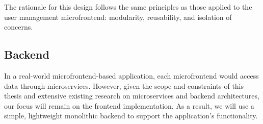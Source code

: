 The rationale for this design follows the same principles as those applied to the user management microfrontend: modularity, reusability, and isolation of concerns.

\subsection{Backend}
In a real-world microfrontend-based application, each microfrontend would access data through microservices. However, given the scope and constraints of this thesis and extensive existing research on microservices and backend architectures, our focus will remain on the frontend implementation. As a result, we will use a simple, lightweight monolithic backend to support the application's functionality.
